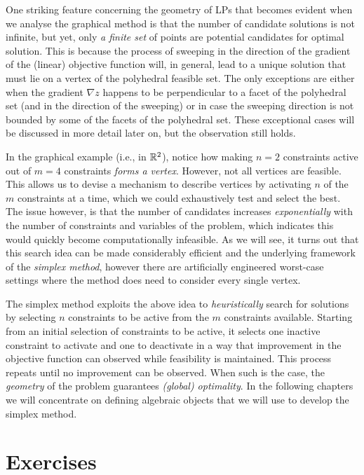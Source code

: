 One striking feature concerning the geometry of LPs that becomes evident when we analyse the graphical method is that the number of candidate solutions is not infinite, but yet, only \emph{a finite set} of points are potential candidates for optimal solution. This is because the process of sweeping in the direction of the gradient of the (linear) objective function will, in general, lead to a unique solution that must lie on a vertex of the polyhedral feasible set. The only exceptions are either when the gradient $\nabla z$ happens to be perpendicular to a facet of the polyhedral set (and in the direction of the sweeping) or in case the sweeping direction is not bounded by some of the facets of the polyhedral set. These exceptional cases will be discussed in more detail later on, but the observation still holds.

In the graphical example (i.e., in $\mathbb{R}^2$), notice how making $n = 2$ constraints active out of $m = 4$ constraints \emph{forms a vertex}. However, not all vertices are feasible. This allows us to devise a mechanism to describe vertices by activating $n$ of the $m$ constraints at a time, which we could exhaustively test and select the best. The issue however, is that the number of candidates increases \emph{exponentially} with the number of constraints and variables of the problem, which indicates this would quickly become computationally infeasible. As we will see, it turns out that this search idea can be made considerably efficient and the underlying framework of the \emph{simplex method}, however there are artificially engineered worst-case settings where the method does need to consider every single vertex.

The simplex method exploits the above idea to \emph{heuristically} search for solutions by selecting $n$ constraints to be active from the $m$ constraints available. Starting from an initial selection of constraints to be active, it selects one inactive constraint to activate and one to deactivate in a way that improvement in the objective function can observed while feasibility is maintained. This process repeats until no improvement can be observed. When such is the case, the \emph{geometry} of the problem guarantees \emph{(global) optimality}. In the following chapters we will concentrate on defining algebraic objects that we will use to develop the simplex method.


\section*{Exercises}


